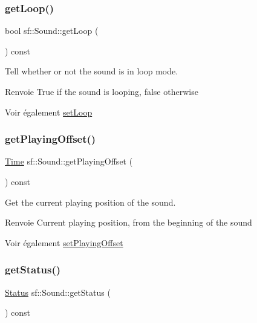 \subsubsection{\texorpdfstring{get\+Loop()}{getLoop()}}
{\footnotesize\ttfamily bool sf\+::\+Sound\+::get\+Loop (\begin{DoxyParamCaption}{ }\end{DoxyParamCaption}) const}



Tell whether or not the sound is in loop mode. 

\begin{DoxyReturn}{Renvoie}
True if the sound is looping, false otherwise
\end{DoxyReturn}
\begin{DoxySeeAlso}{Voir également}
\hyperlink{classsf_1_1Sound_af23ab4f78f975bbabac031102321612b}{set\+Loop} 
\end{DoxySeeAlso}
\mbox{\label{classsf_1_1Sound_a559bc3aea581107bcb380fdbe523aa08}} 
\subsubsection{\texorpdfstring{get\+Playing\+Offset()}{getPlayingOffset()}}
{\footnotesize\ttfamily \hyperlink{classsf_1_1Time}{Time} sf\+::\+Sound\+::get\+Playing\+Offset (\begin{DoxyParamCaption}{ }\end{DoxyParamCaption}) const}



Get the current playing position of the sound. 

\begin{DoxyReturn}{Renvoie}
Current playing position, from the beginning of the sound
\end{DoxyReturn}
\begin{DoxySeeAlso}{Voir également}
\hyperlink{classsf_1_1Sound_ab905677846558042022dd6ab15cddff0}{set\+Playing\+Offset} 
\end{DoxySeeAlso}
\mbox{\label{classsf_1_1Sound_a406fc363594a7718a53ebef49a870f51}} 
\subsubsection{\texorpdfstring{get\+Status()}{getStatus()}}
{\footnotesize\ttfamily \hyperlink{classsf_1_1SoundSource_ac43af72c98c077500b239bc75b812f03}{Status} sf\+::\+Sound\+::get\+Status (\begin{DoxyParamCaption}{ }\end{DoxyParamCaption}) const}



